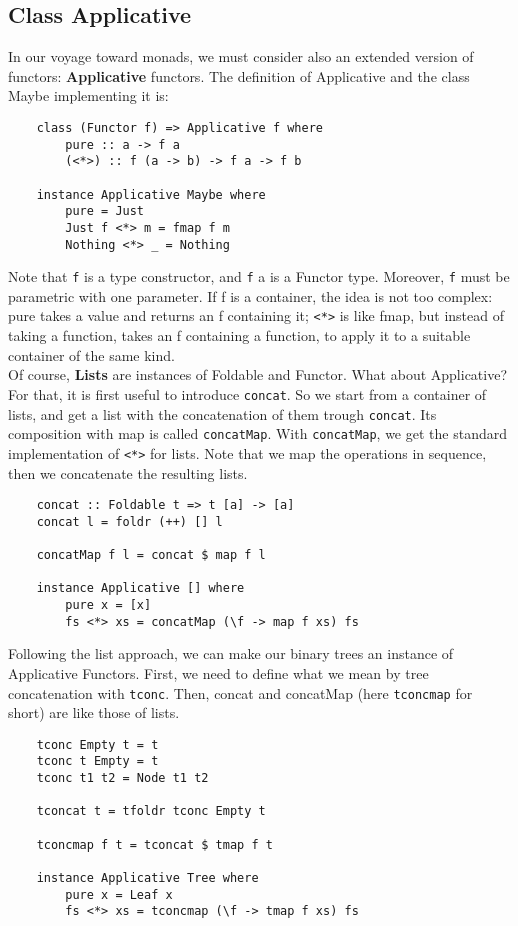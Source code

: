 \subsection{Class Applicative}
In our voyage toward monads, we must consider also an extended version of functors: \textbf{Applicative} functors.
The definition of Applicative and the class Maybe implementing it is:
\begin{lstlisting}
	class (Functor f) => Applicative f where
		pure :: a -> f a
		(<*>) :: f (a -> b) -> f a -> f b
	
	instance Applicative Maybe where
		pure = Just
		Just f <*> m = fmap f m
		Nothing <*> _ = Nothing
\end{lstlisting}
Note that \texttt{f} is a type constructor, and \texttt{f} a is a Functor type.
Moreover, \texttt{f} must be parametric with one parameter.
If f is a container, the idea is not too complex:
pure takes a value and returns an f containing it;
\texttt{<*>} is like fmap, but instead of taking a function, takes an f containing a function, to apply it to a suitable container of the same kind.\\
Of course, \textbf{Lists} are instances of Foldable and Functor. What about Applicative?
For that, it is first useful to introduce \texttt{concat}.
So we start from a container of lists, and get a list with the concatenation of them trough \texttt{concat}.
Its composition with map is called \texttt{concatMap}.
With \texttt{concatMap}, we get the standard implementation of \texttt{<*>} for lists.
Note that we map the operations in sequence, then we concatenate the resulting lists.
\begin{lstlisting}
	concat :: Foldable t => t [a] -> [a]
	concat l = foldr (++) [] l
	
	concatMap f l = concat $ map f l
	
	instance Applicative [] where
		pure x = [x]
		fs <*> xs = concatMap (\f -> map f xs) fs
\end{lstlisting}
Following the list approach, we can make our binary trees an instance of Applicative Functors.
First, we need to define what we mean by tree concatenation with \texttt{tconc}.
Then, concat and concatMap (here \texttt{tconcmap} for short) are like those of lists.
\begin{lstlisting}
	tconc Empty t = t
	tconc t Empty = t
	tconc t1 t2 = Node t1 t2
	
	tconcat t = tfoldr tconc Empty t
	
	tconcmap f t = tconcat $ tmap f t
	
	instance Applicative Tree where
		pure x = Leaf x
		fs <*> xs = tconcmap (\f -> tmap f xs) fs
\end{lstlisting}

